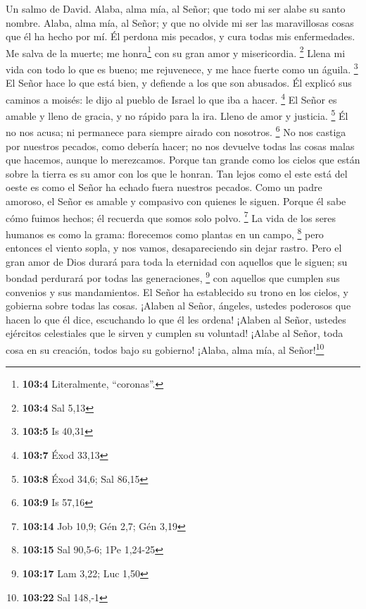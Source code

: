 Un salmo de David.  Alaba, alma mía, al Señor; que todo mi
ser alabe su santo nombre.  Alaba, alma mía, al Señor; y
que no olvide mi ser las maravillosas cosas que él ha hecho por mí.
 Él perdona mis pecados, y cura todas mis enfermedades.
 Me salva de la muerte; me honra\footnote{\textbf{103:4}
  Literalmente, ``coronas''.} con su gran amor y misericordia.
\footnote{\textbf{103:4} Sal 5,13}  Llena mi vida con todo
lo que es bueno; me rejuvenece, y me hace fuerte como un águila.
\footnote{\textbf{103:5} Is 40,31}  El Señor hace lo que
está bien, y defiende a los que son abusados.  Él explicó
sus caminos a moisés: le dijo al pueblo de Israel lo que iba a hacer.
\footnote{\textbf{103:7} Éxod 33,13}  El Señor es amable y
lleno de gracia, y no rápido para la ira. Lleno de amor y justicia.
\footnote{\textbf{103:8} Éxod 34,6; Sal 86,15}  Él no nos
acusa; ni permanece para siempre airado con nosotros. \footnote{\textbf{103:9}
  Is 57,16}  No nos castiga por nuestros pecados, como
debería hacer; no nos devuelve todas las cosas malas que hacemos, aunque
lo merezcamos.  Porque tan grande como los cielos que
están sobre la tierra es su amor con los que le honran. 
Tan lejos como el este está del oeste es como el Señor ha echado fuera
nuestros pecados.  Como un padre amoroso, el Señor es
amable y compasivo con quienes le siguen.  Porque él sabe
cómo fuimos hechos; él recuerda que somos solo polvo. \footnote{\textbf{103:14}
  Job 10,9; Gén 2,7; Gén 3,19}  La vida de los seres
humanos es como la grama: florecemos como plantas en un campo,
\footnote{\textbf{103:15} Sal 90,5-6; 1Pe 1,24-25}  pero
entonces el viento sopla, y nos vamos, desapareciendo sin dejar rastro.
 Pero el gran amor de Dios durará para toda la eternidad
con aquellos que le siguen; su bondad perdurará por todas las
generaciones, \footnote{\textbf{103:17} Lam 3,22; Luc 1,50}
 con aquellos que cumplen sus convenios y sus
mandamientos.  El Señor ha establecido su trono en los
cielos, y gobierna sobre todas las cosas.  ¡Alaben al
Señor, ángeles, ustedes poderosos que hacen lo que él dice, escuchando
lo que él les ordena!  ¡Alaben al Señor, ustedes
ejércitos celestiales que le sirven y cumplen su voluntad!
 ¡Alabe al Señor, toda cosa en su creación, todos bajo su
gobierno! ¡Alaba, alma mía, al Señor!\footnote{\textbf{103:22} Sal
  148,-1}

